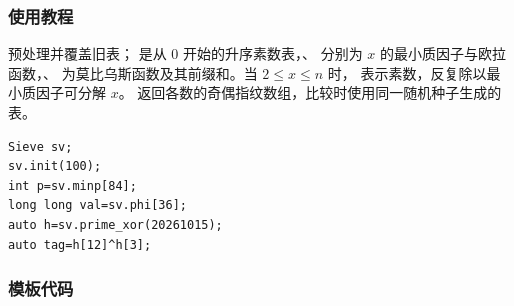 \subsubsection*{使用教程}
 预处理并覆盖旧表； 是从 0 开始的升序素数表，、 分别为 $x$ 的最小质因子与欧拉函数，、 为莫比乌斯函数及其前缀和。当 $2\le x\le n$ 时， 表示素数，反复除以最小质因子可分解 $x$。 返回各数的奇偶指纹数组，比较时使用同一随机种子生成的表。
\begin{lstlisting}[style=mtycpp,numbers=none]
Sieve sv;
sv.init(100);
int p=sv.minp[84];
long long val=sv.phi[36];
auto h=sv.prime_xor(20261015);
auto tag=h[12]^h[3];
\end{lstlisting}

\subsubsection*{模板代码}
